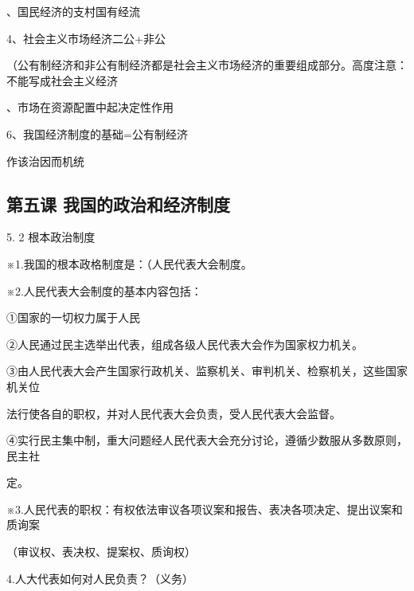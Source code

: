 \documentclass[lang=cn,11pt]{elegantbook}
\newcommand{\daofasym}[1]{{\daofasymbolfont #1}}
\newcommand{\daofasym}[1]{#1}
\begin{document}
、国民经济的支村国有经流\par

4、社会主义市场经济二公+非公\par

（公有制经济和非公有制经济都是社会主义市场经济的重要组成部分。高度注意：不能写成社会主义经济\par

、市场在资源配置中起决定性作用\par

6、我国经济制度的基础=公有制经济\par

作该治因而机统\par

\subsection*{第五课 我国的政治和经济制度}

5. 2 根本政治制度\par

※1.我国的根本政格制度是：（人民代表大会制度。\par

※2.人民代表大会制度的基本内容包括：\par

\daofasym{①}国家的一切权力属于人民\par

\daofasym{②}人民通过民主选举出代表，组成各级人民代表大会作为国家权力机关。\par

\daofasym{③}由人民代表大会产生国家行政机关、监察机关、审判机关、检察机关，这些国家机关位\par

法行使各自的职权，并对人民代表大会负责，受人民代表大会监督。\par

\daofasym{④}实行民主集中制，重大问题经人民代表大会充分讨论，遵循少数服从多数原则，民主社\par

定。\par

※3.人民代表的职权：有权依法审议各项议案和报告、表决各项决定、提出议案和质询案\par

（审议权、表决权、提案权、质询权）\par

4.人大代表如何对人民负责？（义务）\par
\end{document}
